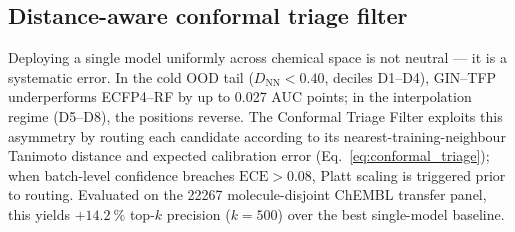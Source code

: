 \subsection{Distance-aware conformal triage filter}

Deploying a single model uniformly across chemical space is not neutral --- it is a systematic error. In the cold OOD tail ($D_{\text{NN}} < 0.40$, deciles D1--D4), GIN--TFP underperforms ECFP4--RF by up to \num{0.027} AUC points; in the interpolation regime (D5--D8), the positions reverse. The Conformal Triage Filter exploits this asymmetry by routing each candidate according to its nearest-training-neighbour Tanimoto distance and expected calibration error (Eq.~\ref{eq:conformal_triage}); when batch-level confidence breaches $\mathrm{ECE} > 0.08$, Platt scaling is triggered prior to routing. Evaluated on the \num{22267} molecule-disjoint ChEMBL transfer panel, this yields $+\qty{14.2}{\percent}$ top-$k$ precision ($k=500$) over the best single-model baseline.
